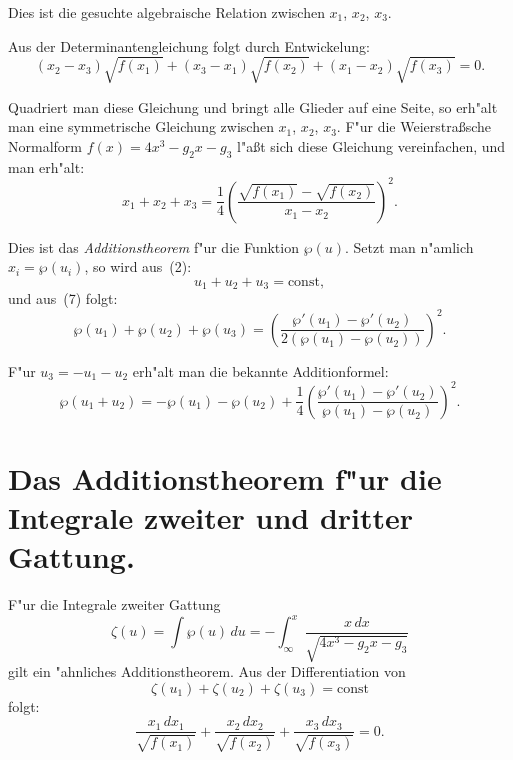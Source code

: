 \documentclass[12pt,a4paper]{article}
\theoremstyle{definition}
\begin{document}
Dies ist die gesuchte algebraische Relation zwischen $x_1$, $x_2$, $x_3$.

\newpage

Aus der Determinantengleichung folgt durch Entwickelung:
\begin{equation}\tag{6}
(x_2 - x_3)\sqrt{f(x_1)} + (x_3 - x_1)\sqrt{f(x_2)} + (x_1 - x_2)\sqrt{f(x_3)} = 0.
\end{equation}

Quadriert man diese Gleichung und bringt alle Glieder auf eine Seite, so erh"alt man eine symmetrische Gleichung zwischen $x_1$, $x_2$, $x_3$. F"ur die Weierstra\ss{}sche Normalform $f(x) = 4x^3 - g_2x - g_3$ l"a\ss{}t sich diese Gleichung vereinfachen, und man erh"alt:
\begin{equation}\tag{7}
x_1 + x_2 + x_3 = \frac{1}{4}\left(\frac{\sqrt{f(x_1)} - \sqrt{f(x_2)}}{x_1 - x_2}\right)^2.
\end{equation}

Dies ist das \emph{Additionstheorem} f"ur die Funktion $\wp(u)$. Setzt man n"amlich $x_i = \wp(u_i)$, so wird aus~(2):
\[u_1 + u_2 + u_3 = \text{const},
\]
und aus~(7) folgt:
\begin{equation}\tag{8}
\wp(u_1) + \wp(u_2) + \wp(u_3) = \left(\frac{\wp'(u_1) - \wp'(u_2)}{2(\wp(u_1) - \wp(u_2))}\right)^2.
\end{equation}

F"ur $u_3 = -u_1 - u_2$ erh"alt man die bekannte Additionformel:
\begin{equation}\tag{9}
\wp(u_1 + u_2) = -\wp(u_1) - \wp(u_2) + \frac{1}{4}\left(\frac{\wp'(u_1) - \wp'(u_2)}{\wp(u_1) - \wp(u_2)}\right)^2.
\end{equation}

\newpage

\section{Das Additionstheorem f"ur die Integrale zweiter und dritter Gattung.}

F"ur die Integrale zweiter Gattung
\begin{equation}\tag{1}
\zeta(u) = \int\wp(u)\,du = -\int_\infty^x \frac{x\,dx}{\sqrt{4x^3 - g_2x - g_3}}
\end{equation}
gilt ein "ahnliches Additionstheorem. Aus der Differentiation von
\[\zeta(u_1) + \zeta(u_2) + \zeta(u_3) = \text{const}
\]
folgt:
\begin{equation}\tag{2}
\frac{x_1\,dx_1}{\sqrt{f(x_1)}} + \frac{x_2\,dx_2}{\sqrt{f(x_2)}} + \frac{x_3\,dx_3}{\sqrt{f(x_3)}} = 0.
\end{equation}
\end{document}
